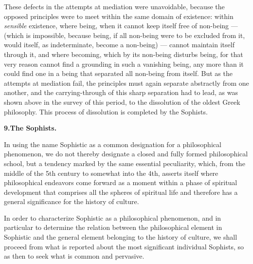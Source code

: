 These defects in the attempts at mediation were unavoidable, because
the opposed principles were to meet within the same domain of
existence: within \emph{sensible} existence, where being, when it
cannot keep itself free of non-being --- (which is impossible, because
being, if all non-being were to be excluded from it, would itself, as
indeterminate, become a non-being) --- cannot maintain itself through
it, and where becoming, which by its non-being disturbs being, for that
very reason cannot find a grounding in such a vanishing being, any more
than it could find one in a being that separated all non-being from
itself. But as the attempts at mediation fail, the principles must
again separate abstractly from one another, and the carrying-through of
this sharp separation had to lead, as was shown above in the survey of
this period, to the dissolution of the oldest Greek philosophy. This
process of dissolution is completed by the Sophists.

\divrule

\begin{center}
\textbf{9.\enspace The Sophists.}
\end{center}

In using the name Sophistic as a common designation for a philosophical
phenomenon, we do not thereby designate a closed and fully formed
philosophical school, but a tendency marked by the same essential
peculiarity, which, from the middle of the 5th century to somewhat into the
4th, asserts itself where philosophical endeavors come forward as a moment
within a phase of spiritual development that comprises all the spheres of
spiritual life and therefore has a general significance for the history of
culture.

In order to characterize Sophistic as a philosophical phenomenon, and in
particular to determine the relation between the philosophical element in
Sophistic and the general element belonging to the history of culture, we
shall proceed from what is reported about the most significant
individual Sophists, so as then to seek what is common and pervasive.

